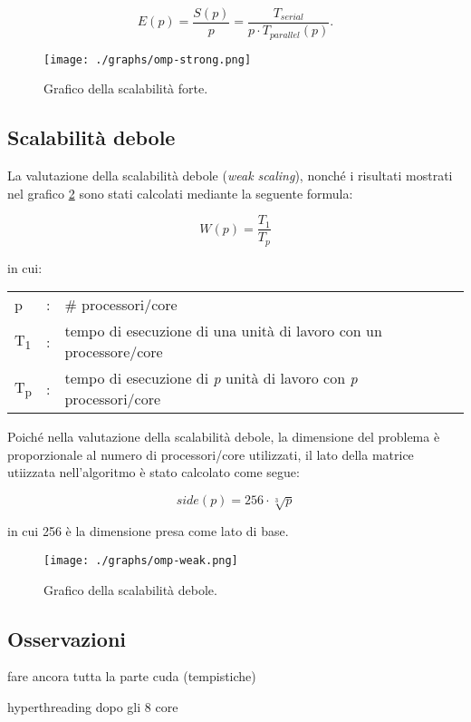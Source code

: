 \[
    E(p) = \frac{S(p)}{p} = \frac{T_{serial}}{p \cdot T_{parallel}(p)}.
\]

\begin{figure}[!ht]
  \centering
  \texttt{[image: ./graphs/omp-strong.png]}
  \caption{Grafico della scalabilità forte.}\label{fig:strong1}
\end{figure}

\subsection{Scalabilità debole}

La valutazione della scalabilità debole (\textit{weak scaling}), nonché i
risultati mostrati nel grafico \ref{fig:weak1} sono stati calcolati mediante
la seguente formula:

\[
W(p) = \frac{T_{1}}{T_{p}}
\]

in cui:
\begin{table}[ht]
\begin{tabular}{lll}
    p &: & \# processori/core\\
    T\textsubscript{1}&: & tempo di esecuzione di una unità di lavoro con un
    processore/core\\
    T\textsubscript{p}&: & tempo di esecuzione di \textit{p} unità di lavoro con
    \textit{p} processori/core
\end{tabular}
\end{table}

Poiché nella valutazione della scalabilità debole, la dimensione del problema è
proporzionale al numero di processori/core utilizzati, il lato della matrice
utiizzata nell'algoritmo è stato calcolato come segue:

\[
side(p) = 256 \cdot \sqrt[3]{p}
\]

in cui 256 è la dimensione presa come lato di base.

\begin{figure}[!ht]
  \centering
  \texttt{[image: ./graphs/omp-weak.png]}
  \caption{Grafico della scalabilità debole.}\label{fig:weak1}
\end{figure}

\subsection{Osservazioni}

fare ancora tutta la parte cuda (tempistiche)

hyperthreading
dopo gli 8 core
